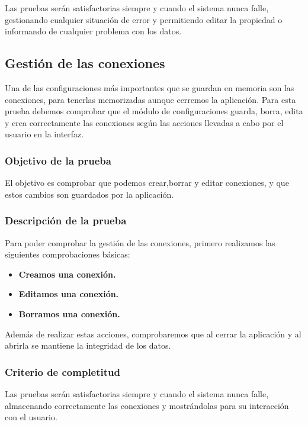 Las pruebas serán satisfactorias siempre y cuando el sistema nunca falle, gestionando cualquier situación de error y permitiendo editar la propiedad o informando de cualquier problema con los datos.

\subsection{Gestión de las conexiones}

Una de las configuraciones más importantes que se guardan en memoria son las conexiones, para tenerlas memorizadas aunque cerremos la aplicación. Para esta prueba debemos comprobar que el módulo de configuraciones guarda, borra, edita y crea correctamente las conexiones según las acciones llevadas a cabo por el usuario en la interfaz.


\subsubsection{Objetivo de la prueba}

El objetivo es comprobar que podemos crear,borrar y editar conexiones, y que estos cambios son guardados por la aplicación.

\subsubsection{Descripción de la prueba}

Para poder comprobar la gestión de las conexiones, primero realizamos las siguientes comprobaciones básicas:


\begin{itemize}
  \item \textbf{Creamos una conexión.}
  \item \textbf{Editamos una conexión.}
  \item \textbf{Borramos una conexión.}
\end{itemize}

\bigskip
Además de realizar estas acciones, comprobaremos que al cerrar la aplicación y al abrirla se mantiene la integridad de los datos.

\subsubsection{Criterio de completitud}

Las pruebas serán satisfactorias siempre y cuando el sistema nunca falle, almacenando correctamente las conexiones y mostrándolas para su interacción con el usuario.

